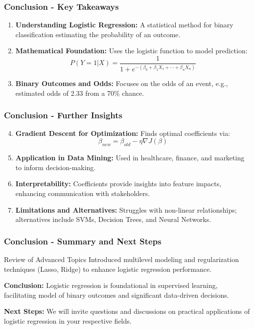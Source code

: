 \documentclass[aspectratio=169]{beamer}
\begin{document}
\begin{frame}[fragile]
    \frametitle{Conclusion - Key Takeaways}
    \begin{enumerate}
        \item \textbf{Understanding Logistic Regression:} 
        A statistical method for binary classification estimating the probability of an outcome.
        
        \item \textbf{Mathematical Foundation:} 
        Uses the logistic function to model prediction:
        \[
        P(Y=1|X) = \frac{1}{1 + e^{-(\beta_0 + \beta_1X_1 + \cdots + \beta_nX_n)}}
        \]
        
        \item \textbf{Binary Outcomes and Odds:} 
        Focuses on the odds of an event, e.g., estimated odds of 2.33 from a 70\% chance.
    \end{enumerate}
\end{frame}

\begin{frame}[fragile]
    \frametitle{Conclusion - Further Insights}
    \begin{enumerate}
        \setcounter{enumi}{3}
        \item \textbf{Gradient Descent for Optimization:}
        Finds optimal coefficients via:
        \[
        \beta_{new} = \beta_{old} - \eta \nabla J(\beta)
        \]

        \item \textbf{Application in Data Mining:} 
        Used in healthcare, finance, and marketing to inform decision-making.
        
        \item \textbf{Interpretability:} 
        Coefficients provide insights into feature impacts, enhancing communication with stakeholders.
        
        \item \textbf{Limitations and Alternatives:} 
        Struggles with non-linear relationships; alternatives include SVMs, Decision Trees, and Neural Networks.
    \end{enumerate}
\end{frame}

\begin{frame}[fragile]
    \frametitle{Conclusion - Summary and Next Steps}
    \begin{block}{Review of Advanced Topics}
        Introduced multilevel modeling and regularization techniques (Lasso, Ridge) to enhance logistic regression performance.
    \end{block}
    
    \textbf{Conclusion:} 
    Logistic regression is foundational in supervised learning, facilitating model of binary outcomes and significant data-driven decisions.

    \textbf{Next Steps:}
    We will invite questions and discussions on practical applications of logistic regression in your respective fields.
\end{frame}
\end{document}
